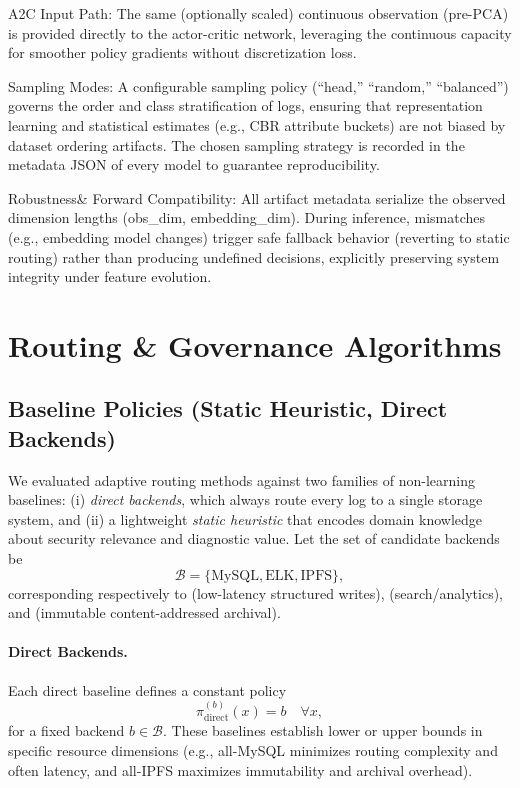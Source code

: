 A2C Input Path: The same (optionally scaled) continuous observation (pre-PCA) is provided directly to the actor-critic network, leveraging the continuous capacity for smoother policy gradients without discretization loss.

Sampling Modes: A configurable sampling policy (“head,” “random,” “balanced”) governs the order and class stratification of logs, ensuring that representation learning and statistical estimates (e.g., CBR attribute buckets) are not biased by dataset ordering artifacts. The chosen sampling strategy is recorded in the metadata JSON of every model to guarantee reproducibility.

Robustness\& Forward Compatibility: All artifact metadata serialize the observed dimension lengths (obs\_dim, embedding\_dim). During inference, mismatches (e.g., embedding model changes) trigger safe fallback behavior (reverting to static routing) rather than producing undefined decisions, explicitly preserving system integrity under feature evolution.
\section{Routing \& Governance Algorithms}\label{s:routing-governance} 
\subsection{Baseline Policies (Static Heuristic, Direct Backends)}
\label{subsec:baseline-policies}

We evaluated adaptive routing methods against two families of non-learning baselines: (i) \emph{direct backends}, which always route every log to a single storage system, and (ii) a lightweight \emph{static heuristic} that encodes domain knowledge about security relevance and diagnostic value. Let the set of candidate backends be
\[
\mathcal{B} = \{\text{MySQL}, \text{ELK}, \text{IPFS}\},
\]
corresponding respectively to (low-latency structured writes), (search/analytics), and (immutable content-addressed archival).

\paragraph{Direct Backends.}
Each direct baseline defines a constant policy
\[
\pi_{\text{direct}}^{(b)}(x) = b \quad \forall x,
\]
for a fixed backend $b \in \mathcal{B}$. These baselines establish lower or upper bounds in specific resource dimensions (e.g., all-MySQL minimizes routing complexity and often latency, and all-IPFS maximizes immutability and archival overhead).

